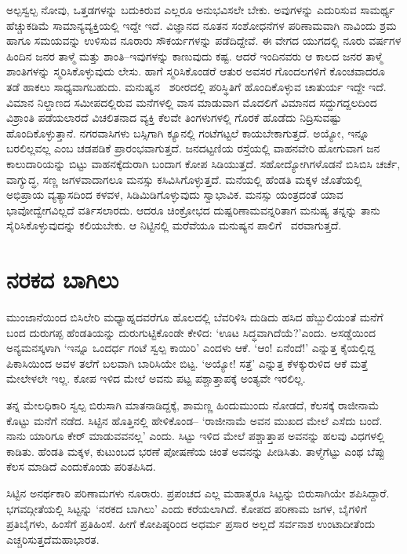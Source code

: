 ಅಲ್ಪಸ್ವಲ್ಪ ನೋವು, ಒತ್ತಡಗಳನ್ನು ಬದುಕಿರುವ ಎಲ್ಲರೂ ಅನುಭವಿಸಲೇ ಬೇಕು. ಅವುಗಳನ್ನು ಎದುರಿಸುವ ಸಾಮರ್ಥ್ಯ ಹೆಚ್ಚುಕಡಿಮೆ ಸಾಮಾನ್ಯವ್ಯಕ್ತಿಯಲ್ಲಿ ಇದ್ದೇ ಇದೆ. ವಿಜ್ಞಾನದ ನೂತನ ಸಂಶೋಧನೆಗಳ ಪರಿಣಾಮವಾಗಿ ನಾವಿಂದು ಶ್ರಮ ಹಾಗೂ ಸಮಯವನ್ನು ಉಳಿಸುವ ನೂರಾರು ಸೌಕರ್ಯಗಳನ್ನು ಪಡೆದಿದ್ದೇವೆ. ಈ ವೇಗದ ಯುಗದಲ್ಲಿ ನೂರು ವರ್ಷಗಳ ಹಿಂದಿನ ಜನರ ತಾಳ್ಮೆ ಮತ್ತು ಶಾಂತಿ–ಇವುಗಳನ್ನು ಕಾಣುವುದು ಕಷ್ಟ. ಆದರೆ ಇಂದಿನವರು ಆ ಕಾಲದ ಜನರ ತಾಳ್ಮೆ ಶಾಂತಿಗಳನ್ನು ಸ್ಮರಿಸಿಕೊಳ್ಳುವುದು ಲೇಸು. ಹಾಗೆ ಸ್ಮರಿಸಿಕೊಂಡರೆ ಆತುರ ಅವಸರ ಗೊಂದಲಗಳಿಗೆ ಕೊಂಚವಾದರೂ ತಡೆ ಹಾಕಲು ಸಾಧ್ಯವಾಗಬಹುದು. ಮನುಷ್ಯನ \hbox{ ಶರೀರದಲ್ಲಿ} ಪರಿಸ್ಥಿತಿಗೆ ಹೊಂದಿಕೊಳ್ಳುವ ಚಾತುರ್ಯ ಇದ್ದೇ ಇದೆ. ವಿಮಾನ ನಿಲ್ದಾಣದ ಸಮೀಪದಲ್ಲಿರುವ ಮನೆಗಳಲ್ಲಿ ವಾಸ ಮಾಡುವಾಗ ಮೊದಲಿಗೆ ವಿಮಾನದ ಸದ್ದುಗದ್ದಲದಿಂದ ವಿಶ್ರಾಂತಿ ಪಡೆಯಲಾರದೆ ವಿಚಲಿತನಾದ ವ್ಯಕ್ತಿ ಕೆಲವೇ ತಿಂಗಳುಗಳಲ್ಲಿ ಗೊರಕೆ ಹೊಡೆದು ನಿದ್ರಿಸುವಷ್ಟು ಹೊಂದಿಕೊಳ್ಳುತ್ತಾನೆ. ನಗರವಾಸಿಗಳು ಬಸ್ಸಿಗಾಗಿ ಕ್ಯೂನಲ್ಲಿ ಗಂಟೆಗಟ್ಟಲೆ ಕಾಯಬೇಕಾಗುತ್ತದೆ. ಅಯ್ಯೋ, ಇನ್ನೂ ಬರಲಿಲ್ಲವಲ್ಲ ಎಂಬ ಚಡಪಡಿಕೆ ಪ್ರಾರಂಭವಾಗುತ್ತದೆ. ಜನದಟ್ಟಣಿಯ ರಸ್ತೆಯಲ್ಲಿ ವಾಹನವೇರಿ ಹೋಗುವಾಗ ಜನ ಕಾಲುದಾರಿಯನ್ನು ಬಿಟ್ಟು ವಾಹನಕ್ಕೆದುರಾಗಿ ಬಂದಾಗ ಕೋಪ ಸಿಡಿಯುತ್ತದೆ. ಸಹೋದ್ಯೋಗಿಗಳೊಡನೆ ಬಿಸಿಬಿಸಿ ಚರ್ಚೆ, ವಾಗ್ಯುದ್ಧ, ಸಣ್ಣ ಜಗಳ\-ವಾದಾಗಲೂ ಮನಸ್ಸು ಕಸಿವಿಸಿಗೊಳ್ಳುತ್ತದೆ. ಮನೆಯಲ್ಲಿ ಹೆಂಡತಿ ಮಕ್ಕಳ ಜೊತೆಯಲ್ಲಿ ಅಭಿಪ್ರಾಯ ವ್ಯತ್ಯಾಸದಿಂದ ಕಳವಳ, ಸಿಡಿಮಿಡಿಗೊಳ್ಳುವುದು ಸ್ವಾಭಾವಿಕ. ಮನಸ್ಸು ಯಂತ್ರದಂತೆ ಯಾವ ಭಾವೋದ್ವೇಗವಿಲ್ಲದೆ ವರ್ತಿಸಲಾರದು. ಆದರೂ ಚಿಂಕ್ರೋಭದ ದುಷ್ಪರಿಣಾಮವನ್ನರಿತಾಗ ಮನುಷ್ಯ ತನ್ನನ್ನು ತಾನು ಸೈರಿಸಿಕೊಳ್ಳುವುದನ್ನು ಕಲಿಯಬೇಕು. ಆ ನಿಟ್ಟಿನಲ್ಲಿ ಮರೆವೆಯೂ ಮನುಷ್ಯನ ಪಾಲಿಗೆ \hbox{ ವರವಾಗುತ್ತದೆ.}


\section*{ನರಕದ ಬಾಗಿಲು}


ಮುಂಜಾನೆಯಿಂದ ಬಿಸಿಲೇರಿ ಮಧ್ಯಾಹ್ನದವರೆಗೂ ಹೊಲದಲ್ಲಿ ಬೆವರಿಳಿಸಿ ದುಡಿದು ಹಸಿದ ಹೆಬ್ಬುಲಿಯಂತೆ ಮನೆಗೆ ಬಂದ ದುರುಗಪ್ಪ ಹೆಂಡತಿಯನ್ನು ದುರುಗುಟ್ಟಿಕೊಂಡೇ ಕೇಳಿದ: ‘ಊಟ ಸಿದ್ಧವಾಗಿದೆಯೆ?’ಎಂದು. ಅಸಡ್ಡೆಯಿಂದ ಅನ್ಯಮನಸ್ಕಳಾಗಿ ‘ಇನ್ನೂ ಒಂದರ್ಧ ಗಂಟೆ ಸ್ವಲ್ಪ ಕಾಯಿರಿ’ ಎಂದಳು ಆಕೆ. ‘ಆಂ! ಏನೆಂದೆ!’ ಎನ್ನುತ್ತ ಕೈಯಲ್ಲಿದ್ದ ಪಿಕಾಸಿಯಿಂದ ಅವಳ ತಲೆಗೆ ಬಲವಾಗಿ ಬಾರಿಸಿಯೇ ಬಿಟ್ಟ. ‘ಅಯ್ಯೋ! ಸತ್ತೆ’ ಎನ್ನುತ್ತ ಕೆಳಕ್ಕುರುಳಿದ ಆಕೆ ಮತ್ತೆ ಮೇಲೇಳಲೇ ಇಲ್ಲ. ಕೋಪ ಇಳಿದ ಮೇಲೆ ಅವನು ಪಟ್ಟ ಪಶ್ಚಾತ್ತಾಪಕ್ಕೆ ಅಂತ್ಯವೇ ಇರಲಿಲ್ಲ.

ತನ್ನ ಮೇಲಧಿಕಾರಿ ಸ್ವಲ್ಪ ಬಿರುಸಾಗಿ ಮಾತನಾಡಿದ್ದಕ್ಕೆ, ಶಾಮಣ್ಣ ಹಿಂದುಮುಂದು ನೋಡದೆ, ಕೆಲಸಕ್ಕೆ ರಾಜೀನಾಮೆ ಕೊಟ್ಟು ಮನೆಗೆ ನಡೆದ. ಸಿಟ್ಟಿನ ಹೊತ್ತಿನಲ್ಲಿ ಹೇಳಿಕೊಂಡ– ‘ರಾಜೀನಾಮೆ ಅವನ ಮುಖದ ಮೇಲೆ ಎಸೆದು ಬಂದೆ. ನಾನು ಯಾರಿಗೂ ಕೇರ್ ಮಾಡುವವನಲ್ಲ’ ಎಂದು. ಸಿಟ್ಟು ಇಳಿದ ಮೇಲೆ ಪಶ್ಚಾತ್ತಾಪ ಅವನನ್ನು ಹಲವು ವಿಧಗಳಲ್ಲಿ ಕಾಡಿತು. ಹೆಂಡತಿ ಮಕ್ಕಳ, ಕುಟುಂಬದ ಭರಣೆ ಪೋಷಣೆಯ ಚಿಂತೆ ಅವನನ್ನು ಪೀಡಿಸಿತು. ತಾಳ್ಮೆಗೆಟ್ಟು ಎಂಥ ಬೆಪ್ಪು ಕೆಲಸ ಮಾಡಿದೆ ಎಂದುಕೊಂಡು ಪರಿತಪಿಸಿದ.

ಸಿಟ್ಟಿನ ಅನರ್ಥಕಾರಿ ಪರಿಣಾಮಗಳು ನೂರಾರು. ಪ್ರಪಂಚದ ಎಲ್ಲ ಮಹಾತ್ಮರೂ ಸಿಟ್ಟನ್ನು ಬಿರುಸಾಗಿಯೇ ಶಪಿಸಿದ್ದಾರೆ. ಭಗವದ್ಗೀತೆಯಲ್ಲಿ ಸಿಟ್ಟನ್ನು ‘ನರಕದ ಬಾಗಿಲು’ ಎಂದು ಕರೆಯಲಾಗಿದೆ. ಕೋಪದ ಪರಿಣಾಮ ಜಗಳ, ಬೈಗಳಿಗೆ ಪ್ರತಿಬೈಗಳು, ಹಿಂಸೆಗೆ ಪ್ರತಿಹಿಂಸೆ. ಹೀಗೆ ಕೋಪಿಷ್ಠರಿಂದ ಅಧರ್ಮ ಪ್ರಸಾರ ಅಲ್ಲದೆ ಸರ್ವನಾಶ ಉಂಟಾದೀತೆಂದು ಎಚ್ಚರಿಸುತ್ತದೆ\break ಮಹಾ\-ಭಾರತ.

